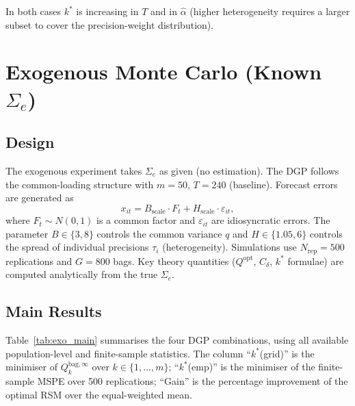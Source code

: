 \documentclass[12pt,a4paper]{article}
\begin{document}
In both cases $k^*$ is increasing in $T$ and in $\hat\alpha$ (higher
heterogeneity requires a larger subset to cover the precision-weight
distribution).

\section{Exogenous Monte Carlo (Known $\Sigma_e$)}

\subsection{Design}

The exogenous experiment takes $\Sigma_e$ as given (no estimation). The DGP
follows the common-loading structure with $m = 50$, $T = 240$ (baseline).
Forecast errors are generated as
\begin{equation}
x_{it} = B_{\mathrm{scale}}\cdot F_t + H_{\mathrm{scale}} \cdot \varepsilon_{it},
\end{equation}
where $F_t \sim N(0,1)$ is a common factor and $\varepsilon_{it}$ are
idiosyncratic errors. The parameter $B \in \{3,8\}$ controls the common
variance $q$ and $H \in \{1.05, 6\}$ controls the spread of individual
precisions $\tau_i$ (heterogeneity). Simulations use $N_{\mathrm{rep}} = 500$
replications and $G = 800$ bags. Key theory quantities ($Q^{\mathrm{opt}}$,
$C_\delta$, $k^*$ formulae) are computed analytically from the true $\Sigma_e$.

\subsection{Main Results}

Table~\ref{tab:exo_main} summarises the four DGP combinations, using all
available population-level and finite-sample statistics. The column
``$k^*$(grid)'' is the minimiser of $Q_k^{\mathrm{bag},\infty}$ over
$k \in \{1,\ldots,m\}$; ``$k^*$(emp)'' is the minimiser of the finite-sample
MSPE over 500 replications; ``Gain'' is the percentage improvement of the
optimal RSM over the equal-weighted mean.
\end{document}
